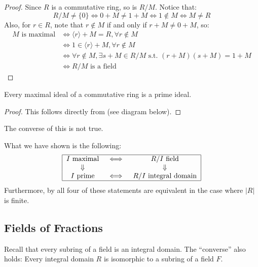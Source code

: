 \documentclass[11pt]{article}
\begin{document}
\begin{proof}
    Since $R$ is a commutative ring, so is $R/M$. Notice that:
    \[R/M\neq\{0\}\iff 0+M\neq 1+M\iff 1\not\in M\iff M\neq R\]
    Also, for $r\in R$, note that $r\not\in M$ if and only if $r+M\neq 0+M$, so:
    \begin{align*}
        M\text{ is maximal}&\iff\langle r\rangle+M=R,\forall r\not\in M \\
        &\iff1\in\langle r\rangle+M,\forall r\not\in M \\
        &\iff\forall r\not\in M,\exists s+M\in R/M\text{ s.t. }(r+M)(s+M)=1+M \\
        &\iff R/M\text{ is a field}
    \end{align*}
\end{proof}

\begin{proposition}
    Every maximal ideal of a commutative ring is a prime ideal.
\end{proposition}

\begin{proof}
    This follows directly from  (see diagram below).
\end{proof}

\begin{remark}
    The converse of this is not true.
\end{remark}

\begin{remark}
    What we have shown is the following:
    \[\begin{tabular}{|ccc|}
        \hline$I$ maximal&$\iff$&$R/I$ field\\
        $\Downarrow$&&$\Downarrow$ \\
        $I$ prime&$\iff$&$R/I$ integral domain \\
        \hline
    \end{tabular}\]
    Furthermore, by  all four of these statements are equivalent in the case where $|R|$ is finite.
\end{remark}

\subsection{Fields of Fractions}

Recall that every subring of a field is an integral domain. The ``converse'' also holds: Every integral domain $R$ is isomorphic to a subring of a field $F$.
\end{document}
